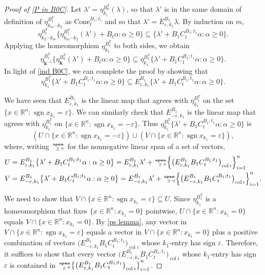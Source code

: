 \documentclass{amsart}
\theoremstyle{definition}
\theoremstyle{remark}
\numberwithin{equation}{section}
\newcommand{\reals}{\mathbb R}
\newcommand{\ep}{\varepsilon}
\newcommand{\col}{\operatorname{col}}
\newcommand{\sgn}{\operatorname{sgn}}
\newcommand{\nnspan}{{\!\!\tiny\begin{array}{r}\mathbf{span}\\\ge0\end{array}\hspace*{-0.57em}}}
\newcommand{\set}[1]{{\lbrace #1 \rbrace}}
\newcommand{\sett}[1]{{\bigl\lbrace #1 \bigr\rbrace}}
\newcommand{\settt}[1]{{\Bigl\lbrace #1 \Bigr\rbrace}}
\newcommand{\0}{{\mathbf{0}}}
\newcommand{\Cone}{\mathrm{Cone}}
\newcommand{\kk}{\mathbf{k}}
\begin{document}
\begin{proof}[Proof of \cref{P in B0C}]
Let $\lambda'=\eta_{k_1}^{B_0^T}(\lambda)$, so that $\lambda'$ is in the same domain of definition of $\eta_{k_m\cdots k_2}^{B_1^T}$ as $\Cone_t^{B_1;t_1}$ and so that $\lambda'=E^{B_1}_{\ep,k_1}\lambda$.
By induction on $m$, 
\[\eta_{k_2\cdots k_m}^{B_t^T}\set{\eta_{k_m\cdots k_2}^{B_1^T}(\lambda')+B_t\alpha:\alpha\ge0}\subseteq\set{\lambda'+B_1C_t^{B_1;t_1}\alpha:\alpha\ge0}.\]
Applying the homeomorphism $\eta_{k_1}^{B_1^T}$ to both sides, we obtain
\[\eta_{\kk^{-1}}^{B_t^T}\set{\eta_\kk^{B_0^T}(\lambda')+B_t\alpha:\alpha\ge0}\subseteq\eta_{k_1}^{B_1^T}\set{\lambda'+B_1C_t^{B_1;t_1}\alpha:\alpha\ge0}.\]
In light of \eqref{ind B0C}, we can complete the proof by showing that
\[\eta_{k_1}^{B_1^T}\sett{\lambda'+B_1C_t^{B_1;t_1}\alpha:\alpha\ge0}\subseteq E^{B_1}_{\ep,k_1}\sett{\lambda'+B_1C_t^{B_1;t_1}\alpha:\alpha\ge0}.\]

We have seen that $E^{B_1}_{\ep,k_1}$ is the linear map that agrees with $\eta_{k_1}^{B_1^T}$ on the set $\set{x\in\reals^n:\sgn x_{k_1}=\ep}$.
We can similarly check that $E^{B_1}_{-\ep,k_1}$ is the linear map that agrees with $\eta_{k_1}^{B_1^T}$ on $\set{x\in\reals^n:\sgn x_{k_1}=-\ep}$.
Thus $\eta_{k_1}^{B_1^T}\set{\lambda'+B_1C_t^{B_1;t_1}\alpha:\alpha\ge0}$ is
\[(U\cap\set{x\in\reals^n:\sgn x_{k_1}=-\ep})\cup(V\cap\set{x\in\reals^n:\sgn x_{k_1}=\ep}),\]
where, writing $\nnspan$ for the nonnegative linear span of a set of vectors,
{\small
\begin{align*}
U&=E^{B_1}_{\ep,k_1}\sett{\lambda'+B_1C_t^{B_1;t_1}\alpha:\alpha\ge0}=E^{B_1}_{\ep,k_1}\lambda'+\nnspan\settt{\bigl(E^{B_1}_{\ep,k_1}B_1C_t^{B_1;t_1}\bigr)_{\col i}}_{i=1}^n\\
V&=E^{B_1}_{-\ep,k_1}\sett{\lambda'+B_1C_t^{B_1;t_1}\alpha:\alpha\ge0}=E^{B_1}_{-\ep,k_1}\lambda'+\nnspan\settt{\bigl(E^{B_1}_{-\ep,k_1}B_1C_t^{B_1;t_1}\bigr)_{\col i}}_{i=1}^n.
\end{align*}
}

We need to show that $V\cap\set{x\in\reals^n:\sgn x_{k_1}=\ep}\subseteq U$.
Since $\eta_{k_1}^{B_1^T}$ is a homeomorphism that fixes $\set{x\in\reals^n:x_{k_1}=0}$ pointwise, $U\cap\set{x\in\reals^n:x_{k_1}=0}$ equals $V\cap\set{x\in\reals^n:x_{k_1}=0}$.
By \cref{ps lemma}, any vector in $V\cap\set{x\in\reals^n:\sgn x_{k_1}=\ep}$ equals a vector in $V\cap\set{x\in\reals^n:x_{k_1}=0}$ plus a positive combination of vectors $\bigl(E^{B_1}_{-\ep,k_1}B_1C_t^{B_1;t_1}\bigr)_{\col i}$ whose $k_1$-entry has sign $\ep$.
Therefore, it suffices to show that every vector $\bigl(E^{B_1}_{-\ep,k_1}B_1C_t^{B_1;t_1}\bigr)_{\col i}$ whose $k_1$-entry has sign~$\ep$ is contained in $\nnspan\sett{\bigl(E^{B_1}_{\ep,k_1}B_1C_t^{B_1;t_1}\bigr)_{\col i}}_{i=1}^n$.


\end{proof}
\end{document}
